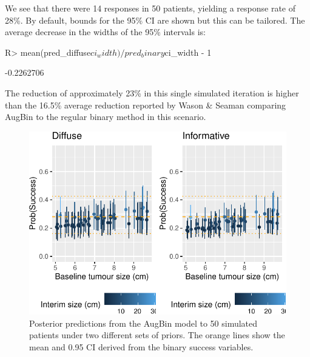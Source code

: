 \documentclass[article]{jss}
\begin{document}
We see that there were 14 responses in 50 patients, yielding a response
rate of 28\%. By default, bounds for the 95\% CI are shown but this can
be tailored. The average decrease in the widths of the 95\% intervals
is:

\begin{CodeChunk}

\begin{CodeInput}
R> mean(pred_diffuse$ci_width) / pred_binary$ci_width - 1
\end{CodeInput}

\begin{CodeOutput}
[1] -0.2262706
\end{CodeOutput}
\end{CodeChunk}

The reduction of approximately 23\% in this single simulated iteration
is higher than the 16.5\% average reduction reported by Wason \& Seaman
comparing AugBin to the regular binary method in this scenario.

\begin{CodeChunk}
\begin{figure}

{\centering \includegraphics{trialr_files/figure-latex/post_pred_augbin-1} 

}

\caption[Posterior predictions from the AugBin model to 50 simulated patients under two different sets of priors]{Posterior predictions from the AugBin model to 50 simulated patients under two different sets of priors. The orange lines show the mean and 0.95 CI derived from the binary success variables.}\label{fig:post_pred_augbin}
\end{figure}
\end{CodeChunk}
\end{document}
